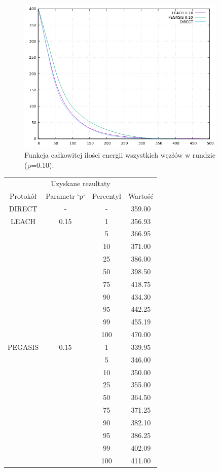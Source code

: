 \documentclass[a4paper,12pt,twoside,openany]{report}
\begin{document}
\begin{figure}[H]
 \centering
 \includegraphics[width=10cm]{images/gnuplot/test_4/energy_in_round_p010.png}
 \caption{Funkcja całkowitej ilości energii wszystkich węzłów w rundzie (p=0.10).}
\end{figure}

\begin{longtable}{*{4}{c}}
\toprule
\multicolumn{4}{c}{Uzyskane rezultaty} \\
Protokół	& Parametr `p`	& Percentyl	& Wartość \\
\midrule
\endhead
DIRECT	& - 	& -	& 359.00 \\*
\midrule
LEACH	& 0.15	& 1	& 356.93 \\*
	&	& 5	& 366.95 \\*
	&	& 10	& 371.00 \\*
	&	& 25	& 386.00 \\*
	&	& 50	& 398.50 \\*
	&	& 75	& 418.75 \\*
	&	& 90	& 434.30 \\*
	&	& 95	& 442.25 \\*
	&	& 99	& 455.19 \\*
	&	& 100	& 470.00 \\*
\midrule
PEGASIS	& 0.15	& 1	& 339.95 \\*
	&	& 5	& 346.00 \\*
	&	& 10	& 350.00 \\*
	&	& 25	& 355.00 \\*
	&	& 50	& 364.50 \\*
	&	& 75	& 371.25 \\*
	&	& 90	& 382.10 \\*
	&	& 95	& 386.25 \\*
	&	& 99	& 402.09 \\*
	&	& 100	& 411.00 \\*
\bottomrule
\end{longtable}
\end{document}
